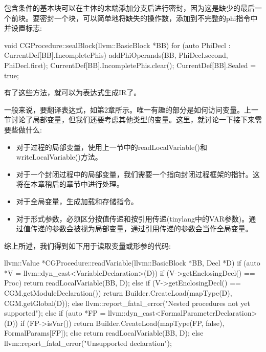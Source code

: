 包含条件的基本块可以在主体的末端添加分支后进行密封，因为这是缺少的最后一个前块。要密封一个块，可以简单地将缺失的操作数，添加到不完整的phi指令中并设置标志:

\begin{cpp}
void CGProcedure::sealBlock(llvm::BasicBlock *BB) {
    for (auto PhiDecl : CurrentDef[BB].IncompletePhis) {
        addPhiOperands(BB, PhiDecl.second, PhiDecl.first);
    }
    CurrentDef[BB].IncompletePhis.clear();
    CurrentDef[BB].Sealed = true;
}
\end{cpp}

有了这些方法，就可以为表达式生成IR了。


一般来说，要翻译表达式，如第2章所示。唯一有趣的部分是如何访问变量。上一节讨论了局部变量，但我们还要考虑其他类型的变量。这里，就讨论一下接下来需要些做什么:

\begin{itemize}
\item
对于过程的局部变量，使用上一节中的readLocalVariable()和writeLocalVariable()方法。

\item
对于一个封闭过程中的局部变量，我们需要一个指向封闭过程框架的指针。这将在本章稍后的章节中进行处理。

\item
对于全局变量，生成加载和存储指令。

\item
对于形式参数，必须区分按值传递和按引用传递(tinylang中的VAR参数)。通过值传递的参数会被视为局部变量，通过引用传递的参数会当作全局变量。
\end{itemize}

综上所述，我们得到如下用于读取变量或形参的代码:

\begin{cpp}
llvm::Value *CGProcedure::readVariable(llvm::BasicBlock *BB,
Decl *D) {
    if (auto *V = llvm::dyn_cast<VariableDeclaration>(D)) {
        if (V->getEnclosingDecl() == Proc)
            return readLocalVariable(BB, D);
        else if (V->getEnclosingDecl() == CGM.getModuleDeclaration()) {
            return Builder.CreateLoad(mapType(D),
            CGM.getGlobal(D));
        } else
        llvm::report_fatal_error("Nested procedures not yet supported");
    } else if (auto *FP = llvm::dyn_cast<FormalParameterDeclaration>(D)) {
        if (FP->isVar()) {
            return Builder.CreateLoad(mapType(FP, false),
            FormalParams[FP]);
        } else
        return readLocalVariable(BB, D);
    } else
        llvm::report_fatal_error("Unsupported declaration");
}
\end{cpp}

